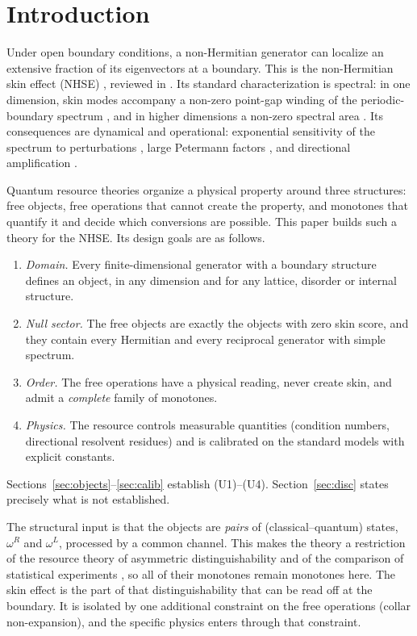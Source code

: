 \documentclass[11pt]{article}
\theoremstyle{definition}
\theoremstyle{remark}
\begin{document}
\section{Introduction}
\label{sec:intro}

Under open boundary conditions, a non-Hermitian generator can localize an extensive fraction of its eigenvectors at a boundary. This is the non-Hermitian skin effect (NHSE) \cite{HN96,YW18,KEBB18,LT19,YM19,OKSS20,ZYF20,ZYF22}, reviewed in \cite{AGU20,BBK21}. Its standard characterization is spectral: in one dimension, skin modes accompany a non-zero point-gap winding of the periodic-boundary spectrum \cite{OKSS20,ZYF20}, and in higher dimensions a non-zero spectral area \cite{ZYF22}. Its consequences are dynamical and operational: exponential sensitivity of the spectrum to perturbations \cite{TE05,BB20}, large Petermann factors \cite{Pet79}, and directional amplification \cite{Por19,WBN20}.

Quantum resource theories \cite{CG19,CFS16} organize a physical property around three structures: free objects, free operations that cannot create the property, and monotones that quantify it and decide which conversions are possible. This paper builds such a theory for the NHSE. Its design goals are as follows.
\begin{enumerate}
\item[(U1)] \emph{Domain.} Every finite-dimensional generator with a boundary structure defines an object, in any dimension and for any lattice, disorder or internal structure.
\item[(U2)] \emph{Null sector.} The free objects are exactly the objects with zero skin score, and they contain every Hermitian and every reciprocal generator with simple spectrum.
\item[(U3)] \emph{Order.} The free operations have a physical reading, never create skin, and admit a \emph{complete} family of monotones.
\item[(U4)] \emph{Physics.} The resource controls measurable quantities (condition numbers, directional resolvent residues) and is calibrated on the standard models with explicit constants.
\end{enumerate}
Sections~\ref{sec:objects}--\ref{sec:calib} establish (U1)--(U4). Section~\ref{sec:disc} states precisely what is not established.

The structural input is that the objects are \emph{pairs} of (classical--quantum) states, $\omega^R$ and $\omega^L$, processed by a common channel. This makes the theory a restriction of the resource theory of asymmetric distinguishability \cite{WW19} and of the comparison of statistical experiments \cite{Bla53,Bus12}, so all of their monotones remain monotones here. The skin effect is the part of that distinguishability that can be read off at the boundary. It is isolated by one additional constraint on the free operations (collar non-expansion), and the specific physics enters through that constraint.
\end{document}

